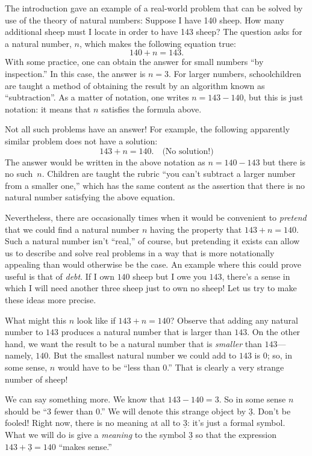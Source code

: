 \documentclass[10pt, a4paper, twocolumn]{article}
\newcommand{\minus}[1]{\underline{#1}}
\begin{document}
The introduction gave an example of a real-world problem that can be
solved by use of the theory of natural numbers: Suppose I have 140
sheep. How many additional sheep must I locate in order to have 143
sheep? The question asks for a natural number, $n$, which makes the
following equation true:
\begin{equation*}
140 + n = 143.
\end{equation*}
With some practice, one can obtain the answer for small numbers ``by
inspection.'' In this case, the answer is $n=3$. For larger numbers,
schoolchildren are taught a method of obtaining the result by an
algorithm known as ``subtraction''. As a matter of notation, one
writes $n = 143 - 140$, but this is just notation: it means that $n$
satisfies the formula above.

Not all such problems have an answer! For example, the following
apparently similar problem does not have a solution:
\begin{equation*}
143 + n = 140. \quad\text{(No solution!)}
\end{equation*}
The answer would be written in the above notation as $n=140-143$ but there
is no such~$n$. Children are taught the rubric ``you can't
subtract a larger number from a smaller one,'' which has the same
content as the assertion that there is no natural number satisfying
the above equation.

Nevertheless, there are occasionally times when it would be convenient
to \emph{pretend} that we could find a natural number $n$ having the
property that $143+n=140$. Such a natural number isn't ``real,'' of
course, but pretending it exists can allow us to describe and solve
real problems in a way that is more notationally appealing than would
otherwise be the case. An example where this could prove useful is
that of \emph{debt}. If I own $140$ sheep but I owe you $143$, there's
a sense in which I will need another three sheep just to own no sheep!
Let us try to make these ideas more precise.

What might this $n$ look like if $143+n=140$? Observe that adding any natural
number to $143$ produces a natural number that is larger than
$143$. On the other hand, we want the result to be a natural number
that is \emph{smaller} than $143$---namely, $140$. But the smallest
natural number we could add to $143$ is $0$; so, in some sense, $n$
would have to be ``less than $0$.'' That is clearly a very strange
number of sheep!

We can say something more. We know that $143-140=3$. So in some sense
$n$ should be ``$3$ fewer than $0$.'' We will denote this strange
object by $\minus{3}$. Don't be fooled! Right now, there is no meaning
at all to $\minus{3}$: it's just a formal symbol. What we will do is
give a \emph{meaning} to the symbol $\minus{3}$ so that the expression
$143 + \minus{3} = 140$ ``makes sense.''
\end{document}
